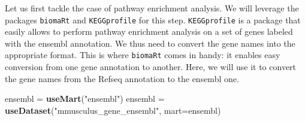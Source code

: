 \documentclass[9pt,a4paper,]{extarticle}
\newenvironment{Shaded}{\begin{snugshade}}{\end{snugshade}}
\newcommand{\CommentTok}[1]{\textcolor[rgb]{0.56,0.35,0.01}{\textit{#1}}}
\newcommand{\DataTypeTok}[1]{\textcolor[rgb]{0.13,0.29,0.53}{#1}}
\newcommand{\DecValTok}[1]{\textcolor[rgb]{0.00,0.00,0.81}{#1}}
\newcommand{\KeywordTok}[1]{\textcolor[rgb]{0.13,0.29,0.53}{\textbf{#1}}}
\newcommand{\NormalTok}[1]{#1}
\newcommand{\OperatorTok}[1]{\textcolor[rgb]{0.81,0.36,0.00}{\textbf{#1}}}
\newcommand{\OtherTok}[1]{\textcolor[rgb]{0.56,0.35,0.01}{#1}}
\newcommand{\StringTok}[1]{\textcolor[rgb]{0.31,0.60,0.02}{#1}}
\begin{document}
Let us first tackle the case of pathway enrichment analysis. We will leverage
the packages \texttt{biomaRt} \citep{durinck:biomart} and \texttt{KEGGprofile} \citep{zhao:keggprofile}
for this step. \texttt{KEGGprofile} is a
package that easily allows to perform pathway enrichment analysis on a set of
genes labeled with the ensembl annotation. We thus need to convert the gene
names into the appropriate format. This is where \texttt{biomaRt} comes in handy: it
enables easy conversion from one gene annotation to another. Here, we will use
it to convert the gene names from the Refseq annotation to the ensembl one.

\begin{Shaded}
\begin{Highlighting}[]
\NormalTok{ensembl =}\StringTok{ }\KeywordTok{useMart}\NormalTok{(}\StringTok{"ensembl"}\NormalTok{)}
\NormalTok{ensembl =}\StringTok{ }\KeywordTok{useDataset}\NormalTok{(}\StringTok{"mmusculus_gene_ensembl"}\NormalTok{, }\DataTypeTok{mart=}\NormalTok{ensembl)}
\end{Highlighting}
\end{Shaded}

\begin{Shaded}
\end{Shaded}
\end{document}
